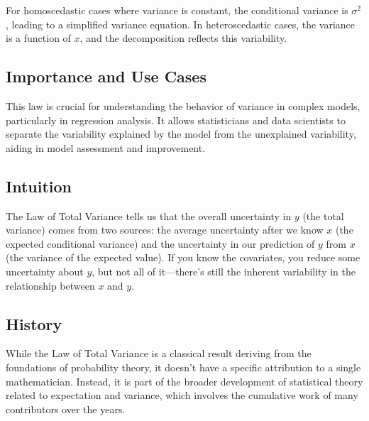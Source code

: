 \documentclass{article}
\begin{document}
For homoscedastic cases where variance is constant, the conditional variance is \( \sigma^2 \), leading to a simplified variance equation. In heteroscedastic cases, the variance is a function of \( x \), and the decomposition reflects this variability.

\subsection{Importance and Use Cases}
This law is crucial for understanding the behavior of variance in complex models, particularly in regression analysis. It allows statisticians and data scientists to separate the variability explained by the model from the unexplained variability, aiding in model assessment and improvement.

\subsection{Intuition}
The Law of Total Variance tells us that the overall uncertainty in \( y \) (the total variance) comes from two sources: the average uncertainty after we know \( x \) (the expected conditional variance) and the uncertainty in our prediction of \( y \) from \( x \) (the variance of the expected value). If you know the covariates, you reduce some uncertainty about \( y \), but not all of it—there's still the inherent variability in the relationship between \( x \) and \( y \).

\subsection{History}
While the Law of Total Variance is a classical result deriving from the foundations of probability theory, it doesn't have a specific attribution to a single mathematician. Instead, it is part of the broader development of statistical theory related to expectation and variance, which involves the cumulative work of many contributors over the years.
\end{document}
